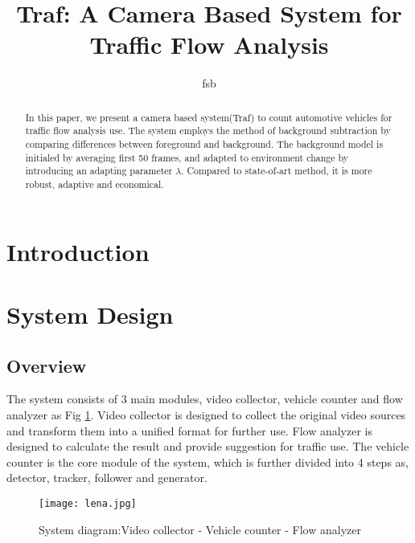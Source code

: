 \documentclass[conference]{IEEEtran}
\begin{document}
\title{Traf: A Camera Based System for Traffic Flow Analysis}
\maketitle
\author{fsb}

\begin{abstract}

In this paper, we present a camera based system(Traf) to count automotive vehicles for traffic flow analysis use. The system employs the method of background subtraction by comparing differences between foreground and background. The background model is initialed by averaging first 50 frames, and adapted to environment change by introducing an adapting parameter $\lambda$. Compared to state-of-art method, it is more robust, adaptive and economical.

\end{abstract}


\section{Introduction}


\section{System Design}
	\subsection{Overview}
	The system consists of 3 main modules, video collector, vehicle counter and flow analyzer as Fig \ref{fig:sysDiagram}. Video collector is designed to collect the original video sources and transform them into a unified format for further use. Flow analyzer is designed to calculate the result and provide suggestion for traffic use. The vehicle counter is the core module of the system, which is further divided into 4 steps as, detector, tracker, follower and generator. 
	
	\begin{figure}[!h]
	\centering
	\texttt{[image: lena.jpg]} 
	\caption{System diagram:Video collector - Vehicle counter - Flow analyzer}
	\label{fig:sysDiagram}
	\end{figure}
	
\end{document}

